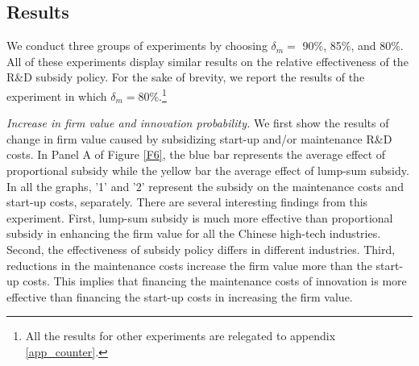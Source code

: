 \documentclass[11pt]{article}
\begin{document}
\subsection{Results} 
We conduct three groups of experiments by choosing $\delta_{m}=$ 90\%, 85\%, and 80\%. All of these experiments display similar results on the relative effectiveness of the R\&D subsidy policy. For the sake of brevity, we report the results of the experiment in which $\delta_{m}=80\%$.\footnote{All the results for other experiments are relegated to appendix \ref{app_counter}.} 

\textit{Increase in firm value and innovation probability.} We first show the results of change in firm value caused by subsidizing start-up and/or maintenance R\&D costs. In Panel A of Figure \ref{F6}, the blue bar represents the average effect of proportional subsidy while the yellow bar the average effect of lump-sum subsidy. In all the graphs, '1' and '2' represent the subsidy on the maintenance costs and start-up costs, separately. There are several interesting findings from this experiment. First, lump-sum subsidy is much more effective than proportional subsidy in enhancing the firm value for all the Chinese high-tech industries. Second, the effectiveness of subsidy policy differs in different industries. Third, reductions in the maintenance costs increase the firm value more than the start-up costs. This implies that financing the maintenance costs of innovation is more effective than financing the start-up costs in increasing the firm value. 
\end{document}
